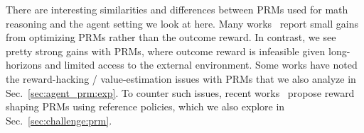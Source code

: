 There are interesting similarities and differences between PRMs used for math reasoning and the agent setting we look at here. Many works~\cite{havrilla2024teaching, shao2024deepseekmath, uesato2022solving} report small gains from optimizing PRMs rather than the outcome reward. In contrast, we see pretty strong gains with PRMs, where outcome reward is infeasible given long-horizons and limited access to the external environment. Some works have noted the reward-hacking / value-estimation issues with PRMs that we also analyze in Sec.~\ref{sec:agent_prm:exp}. To counter such issues, recent works~\citep{setlur2024rewarding} propose reward shaping PRMs using reference policies, which we also explore in Sec.~\ref{sec:challenge:prm}.



\vspace{-1em}